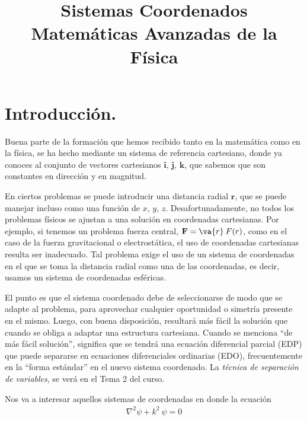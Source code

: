  
\title{Sistemas Coordenados \\ {\large Matemáticas Avanzadas de la Física}\vspace{-1.5\baselineskip}}
\date{ }
\author{}

\renewcommand\labelenumii{\theenumi.{\arabic{enumii}}}
\maketitle
\fontsize{14}{14}\selectfont
\section{Introducción.}
Buena parte de la formación que hemos recibido tanto en la matemática como en la física, se ha hecho mediante un sistema de referencia cartesiano, donde ya conoces al conjunto de vectores cartesianos $\mathbf{i}$, $\mathbf{j}$, $\mathbf{k}$, que sabemos que son constantes en dirección y en magnitud. 
\par
En ciertos problemas se puede introducir una distancia radial $\mathbf{r}$, que se puede manejar incluso como una función de $x$, $y$, $z$. Desafortunadamente, no todos los problemas físicos se ajustan a una solución en coordenadas cartesianas. Por ejemplo, si tenemos un problema fuerza central, $\mathbf{F} = \va{r} \: F(r)$, como en el caso de la fuerza gravitacional o electrostática, el uso de coordenadas cartesianas resulta ser inadecuado. Tal problema exige el uso de un sistema de coordenadas en el que se toma la distancia radial como una de las coordenadas, es decir, usamos un sistema de coordenadas esféricas.
\par
El punto es que el sistema coordenado debe de seleccionarse de modo que se adapte al problema, para aprovechar cualquier oportunidad o simetría presente en el mismo. Luego, con buena disposición, resultará más fácil la solución que cuando se obliga a adaptar una estructura cartesiana. Cuando se menciona \enquote{de más fácil solución}, significa que se tendrá una ecuación diferencial parcial (EDP) que puede separarse en ecuaciones diferenciales ordinarias (EDO), frecuentemente en la \enquote{forma estándar} en el nuevo sistema coordenado. La \emph{técnica de separación de variables}, se verá en el Tema 2 del curso.
\par
Nos va a interesar aquellos sistemas de coordenadas en donde la ecuación
\begin{align}
\nabla^{2} \psi + k^{2} \: \psi = 0
\end{align}
